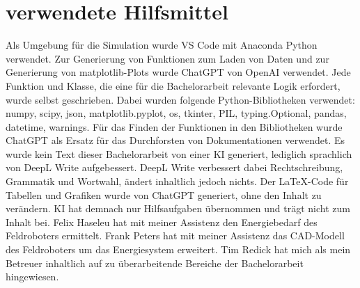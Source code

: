 \section{verwendete Hilfsmittel}
Als Umgebung für die Simulation wurde VS Code mit Anaconda Python verwendet. Zur Generierung von Funktionen zum Laden von Daten und zur Generierung von matplotlib-Plots wurde ChatGPT von OpenAI verwendet. Jede Funktion und Klasse, die eine für die Bachelorarbeit relevante Logik erfordert, wurde selbst geschrieben. Dabei wurden folgende Python-Bibliotheken verwendet: numpy, scipy, json, matplotlib.pyplot, os, tkinter, PIL, typing.Optional, pandas, datetime, warnings. Für das Finden der Funktionen in den Bibliotheken wurde ChatGPT als Ersatz für das Durchforsten von Dokumentationen verwendet. Es wurde kein Text dieser Bachelorarbeit von einer KI generiert, lediglich sprachlich von DeepL Write aufgebessert. DeepL Write verbessert dabei Rechtschreibung, Grammatik und Wortwahl, ändert inhaltlich jedoch nichts. Der LaTeX-Code für Tabellen und Grafiken wurde von ChatGPT generiert, ohne den Inhalt zu verändern. KI hat demnach nur Hilfsaufgaben übernommen und trägt nicht zum Inhalt bei. Felix Haseleu hat mit meiner Assistenz den Energiebedarf des Feldroboters ermittelt. Frank Peters hat mit meiner Assistenz das CAD-Modell des Feldroboters um das Energiesystem erweitert. Tim Redick hat mich als mein Betreuer inhaltlich auf zu überarbeitende Bereiche der Bachelorarbeit hingewiesen.